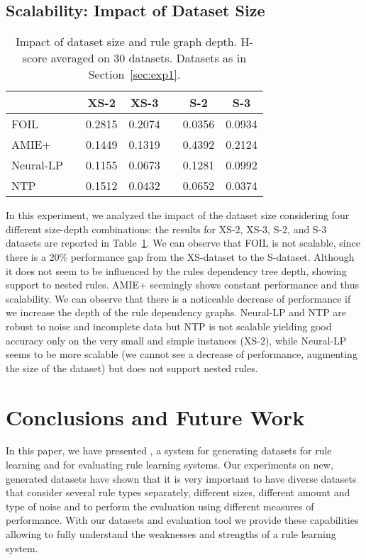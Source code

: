 \documentclass[letterpaper]{article} \usepackage{aaai20}  \usepackage{times}  \usepackage{helvet} \usepackage{courier}  \usepackage[hyphens]{url}  \usepackage{graphicx} \urlstyle{rm} \def\UrlFont{\rm}  \usepackage{graphicx}  \frenchspacing  \setlength{\pdfpagewidth}{8.5in}  \setlength{\pdfpageheight}{11in}  \usepackage{amsthm}
\theoremstyle{definition}
\newcommand{\tool}{\text{RuDaS}\xspace}
\begin{document}
\subsection{Scalability: Impact of Dataset Size}
\begin{table}[h!]
    \centering
\begin{tabular}{lcccccc}
    \toprule
&& XS-2 &  XS-3 && S-2 & S-3  \\
     \midrule 
     FOIL  && 0.2815 &	0.2074 &&	0.0356 &	0.0934 \\
     AMIE+  && 0.1449 &	0.1319 &&	0.4392 &	0.2124 \\
     Neural-LP   && 0.1155 &	0.0673 &&	0.1281 &	0.0992 \\
     NTP && 0.1512 &	0.0432 &&	0.0652 &	0.0374 \\
\bottomrule
    \end{tabular}
    \caption{Impact of dataset size and rule graph depth. H-score averaged on 30 datasets. Datasets as in Section~\ref{sec:exp1}.}
    \label{tab:results_4}
\end{table}
In this experiment, we analyzed the impact of the dataset size considering four different size-depth combinations:  
the results for XS-2, XS-3, S-2, and S-3 datasets are reported in Table~\ref{tab:results_4}.
We can observe that FOIL is not scalable, since there is a 20\% performance gap from the XS-dataset to the S-dataset. Although it does not seem to be influenced by the rules dependency tree depth, showing support to nested rules. 
AMIE+ seemingly shows constant performance and thus scalability. We can observe that there is a noticeable decrease of performance if we increase the depth of the rule dependency graphs.
Neural-LP and NTP are robust to noise and incomplete data but NTP is not scalable yielding good accuracy only on the very small and simple instances (XS-2), while
Neural-LP seems to be more scalable (we cannot see a decrease of performance, augmenting the size of the dataset) but does not support nested rules.

\section{Conclusions and Future Work}\label{sec:conclusions}



In this paper, we have presented \tool, a system for generating datasets for rule learning and for evaluating rule learning systems.
Our experiments on new, generated datasets have shown that it is very important to have diverse datasets that consider several rule types separately, different sizes, different amount and type of noise and to perform the evaluation using different measures of performance. With our datasets and evaluation tool we provide these capabilities allowing to fully understand the weaknesses and strengths of a rule learning system.
\end{document}
